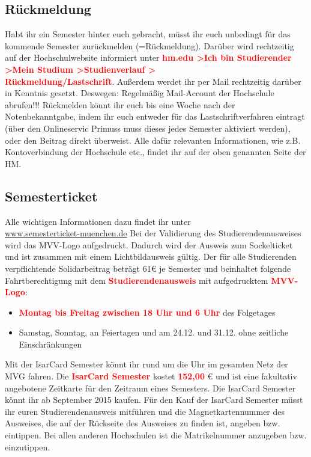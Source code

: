 \subsection{Rückmeldung}

Habt ihr ein Semester hinter euch gebracht, müsst ihr euch unbedingt für das kommende Semester zurückmelden (=Rückmeldung). Darüber wird rechtzeitig auf der Hochschulwebsite informiert unter \textcolor{red}{\textbf{hm.edu \textgreater Ich bin Studierender \textgreater Mein Studium \textgreater Studienverlauf \textgreater\\ Rückmeldung/Lastschrift}}. Außerdem werdet ihr per Mail rechtzeitig darüber in Kenntnis gesetzt. Deswegen: Regelmäßig Mail-Account der Hochschule abrufen!!! Rückmelden könnt ihr euch bis eine Woche nach der Notenbekanntgabe, indem ihr euch entweder für das Lastschriftverfahren eintragt (über den Onlineservic Primuss muss dieses jedes Semester aktiviert werden), oder den Beitrag direkt überweist.\doublebreak
Alle dafür relevanten Informationen, wie z.B. Kontoverbindung der Hochschule etc., findet ihr auf der oben genannten Seite der HM.


\subsection{Semesterticket}

Alle wichtigen Informationen dazu findet ihr unter\\
\url{www.semesterticket-muenchen.de}\doublebreak
Bei der Validierung des Studierendenausweises wird das MVV-Logo aufgedruckt. Dadurch wird der Ausweis zum Sockelticket und ist zusammen mit einem Lichtbildausweis gültig. Der für alle Studierenden verpflichtende Solidarbeitrag beträgt 61€ je Semester und beinhaltet folgende Fahrtberechtigung mit dem \textcolor{red}{\textbf{Studierendenausweis}} mit aufgedrucktem \textcolor{red}{\textbf{MVV-Logo}}:
\begin{itemize}
	\item \textcolor{red}{\textbf{Montag bis Freitag zwischen 18 Uhr und 6 Uhr}} des Folgetages
	\item Samstag, Sonntag, an Feiertagen und am 24.12. und 31.12. ohne
	zeitliche Einschränkungen
\end{itemize}
Mit der IsarCard Semester könnt ihr rund um die Uhr im gesamten Netz der MVG fahren. Die \textcolor{red}{\textbf{IsarCard Semester}} kostet \textcolor{red}{\textbf{152,00}} € und ist eine fakultativ angebotene Zeitkarte für den Zeitraum eines Semesters. Die IsarCard Semester könnt ihr ab September 2015 kaufen. Für den Kauf der IsarCard Semester müsst ihr euren Studierendenausweis mitführen und die Magnetkartennummer des Ausweises, die auf der Rückseite des Ausweises zu finden ist, angeben bzw. eintippen. Bei allen anderen Hochschulen ist die Matrikelnummer anzugeben bzw. einzutippen.

